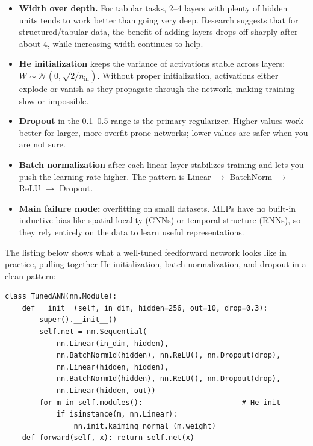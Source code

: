 \documentclass[12pt, letterpaper]{article}
\begin{document}
\begin{itemize}
    \item \textbf{Width over depth.} For tabular tasks, 2--4 layers with plenty of hidden units tends to work better than going very deep. Research suggests that for structured/tabular data, the benefit of adding layers drops off sharply after about 4, while increasing width continues to help.
    \item \textbf{He initialization} keeps the variance of activations stable across layers: $W \sim \mathcal{N}(0, \sqrt{2/n_{\text{in}}})$. Without proper initialization, activations either explode or vanish as they propagate through the network, making training slow or impossible.
    \item \textbf{Dropout} in the 0.1--0.5 range is the primary regularizer. Higher values work better for larger, more overfit-prone networks; lower values are safer when you are not sure.
    \item \textbf{Batch normalization} after each linear layer stabilizes training and lets you push the learning rate higher. The pattern is Linear $\rightarrow$ BatchNorm $\rightarrow$ ReLU $\rightarrow$ Dropout.
    \item \textbf{Main failure mode:} overfitting on small datasets. MLPs have no built-in inductive bias like spatial locality (CNNs) or temporal structure (RNNs), so they rely entirely on the data to learn useful representations.
\end{itemize}

The listing below shows what a well-tuned feedforward network looks like in practice, pulling together He initialization, batch normalization, and dropout in a clean pattern:

\noindent\begin{minipage}{\linewidth}
\begin{lstlisting}[caption={A well-structured feedforward network}]
class TunedANN(nn.Module):
    def __init__(self, in_dim, hidden=256, out=10, drop=0.3):
        super().__init__()
        self.net = nn.Sequential(
            nn.Linear(in_dim, hidden),
            nn.BatchNorm1d(hidden), nn.ReLU(), nn.Dropout(drop),
            nn.Linear(hidden, hidden),
            nn.BatchNorm1d(hidden), nn.ReLU(), nn.Dropout(drop),
            nn.Linear(hidden, out))
        for m in self.modules():                       # He init
            if isinstance(m, nn.Linear):
                nn.init.kaiming_normal_(m.weight)
    def forward(self, x): return self.net(x)
\end{lstlisting}
\end{minipage}
\end{document}
